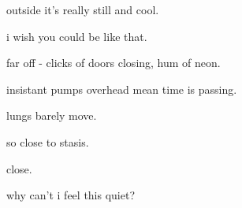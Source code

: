 \documentclass[extrafontsizes, 48pt]{memoir}
\newcommand\blankpage{%
    \null
    \thispagestyle{empty}%
    \addtocounter{page}{-1}%
    \newpage}
\begin{document}
	\begin{minipage}{.6\textwidth}
	outside it's really still and cool.
	\afterpage{\blankpage}
	\end{minipage}
	\newpage

	\begin{minipage}{.6\textwidth}
	i wish you could be like that.
	\end{minipage}
	\newpage

	\begin{minipage}{.6\textwidth}
	far off - clicks of doors closing, hum of neon.
	\end{minipage}
	\newpage

	\begin{minipage}{.6\textwidth}
	insistant pumps overhead mean time is passing.
	\end{minipage}
	\newpage

	\begin{minipage}{.6\textwidth}
	lungs barely move.
	\end{minipage}
	\newpage

	\begin{minipage}{.6\textwidth}
	so close to stasis.
	\end{minipage}
	\newpage

	\begin{minipage}{.6\textwidth}
	close.
	\afterpage{\blankpage}
	\end{minipage}
	\newpage

	\begin{minipage}{.6\textwidth}
	why can't i feel this quiet?
	\afterpage{\blankpage}
	\end{minipage}
	\newpage
\end{document}
